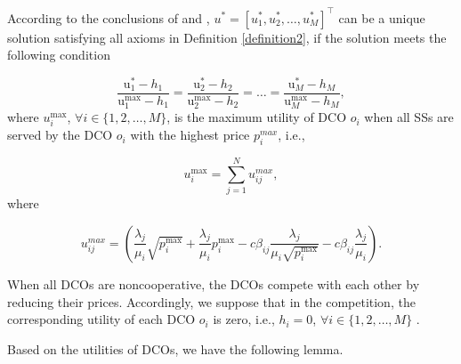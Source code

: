 \documentclass[twocolumn,10pt]{IEEEtran}
\begin{document}
According to the conclusions of \cite{JChen01} and \cite{CZhang01}, $u^*=[u_{1}^*,u_{2}^*,\ldots,u_{M}^*]^\top$ can be a unique solution satisfying all axioms in Definition \ref{definition2}, if the solution meets the following condition

\begin{equation}
    \frac{{{\text{u}}_{1}^* -  {{h_{1}}} }}{{{\text{u}}_{1}^{\max } -  {{h_{1}}} }} = \frac{{{\text{u}}_{2}^* -  {{h_{2}}} }}{{{\text{u}}_{2}^{\max } -  {{h_{2}}} }} = \ldots = \frac{{{\text{u}}_{M}^* -  {{h_{M}}} }}{{{\text{u}}_{M}^{\max } -  {{h_{M}}} }},
\end{equation}
where ${{u}}_{i}^{\max }$, $\forall i \in \{1,2,\ldots,M\}$, is the maximum utility of DCO $o_i$ when all SSs are served by the DCO $o_i$ with the highest price $p^{max}_i$, i.e.,

\begin{equation}
    {{u}}_{i}^{\max }= \sum\limits_{j = 1}^N {u^{max}_{ij}},
\end{equation}
where

\begin{equation}
u^{max}_{ij}=\left( {\frac{{{\lambda _j}}}{{{\mu _i}}}\sqrt {p_i^{\max }}  + \frac{{{\lambda _j}}}{{{\mu _i}}}p_i^{\max } - c{\beta _{ij}}\frac{{{\lambda _j}}}{{{\mu _i}\sqrt {p_i^{\max }} }} - c{\beta _{ij}}\frac{{{\lambda _j}}}{{{\mu _i}}}} \right).
\end{equation}

When all DCOs are noncooperative, the DCOs compete with each other by reducing their prices. Accordingly, we suppose that in the competition, the corresponding utility of each DCO $o_i$ is zero, i.e., $h_i=0$, $\forall i \in \{1,2,\ldots,M\}$ \cite{Huaqing01}.


Based on the utilities of DCOs, we have the following lemma.

\vspace{0.2 cm}
\end{document}
